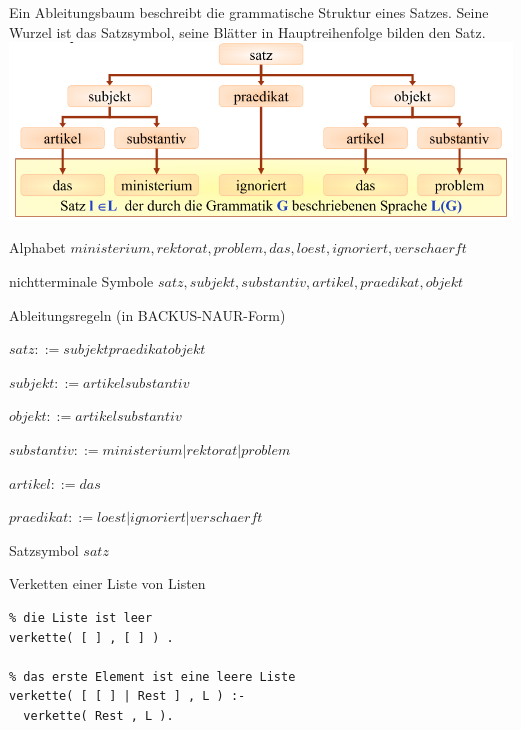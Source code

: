 \documentclass[a4paper]{article}
\begin{document}
\begin{multicols}{3}
  Ein Ableitungsbaum beschreibt die grammatische Struktur eines Satzes.
  Seine Wurzel ist das Satzsymbol, seine Blätter in Hauptreihenfolge
  bilden den Satz.
  \includegraphics[width=\linewidth]{Assets/Logik-ableitungsbaum-beispiel.png}

  \begin{enumerate*}
    \itemsep1pt\parskip0pt
    \item
          Alphabet
          $ministerium, rektorat, problem, das, loest, ignoriert, verschaerft$
    \item
          nichtterminale Symbole
          $satz, subjekt, substantiv, artikel, praedikat,objekt$
    \item
          Ableitungsregeln (in BACKUS-NAUR-Form)

          \begin{itemize*}
            \item
                  $satz ::= subjekt praedikat objekt$
            \item
                  $subjekt ::= artikel substantiv$
            \item
                  $objekt ::=  artikel substantiv$
            \item
                  $substantiv ::= ministerium | rektorat | problem$
            \item
                  $artikel ::= das$
            \item
                  $praedikat ::= loest | ignoriert | verschaerft$
          \end{itemize*}
    \item
          Satzsymbol $satz$
  \end{enumerate*}

  Verketten einer Liste von Listen

  \begin{verbatim}
% die Liste ist leer
verkette( [ ] , [ ] ) .

% das erste Element ist eine leere Liste
verkette( [ [ ] | Rest ] , L ) :-
  verkette( Rest , L ).


\end{verbatim}
\end{multicols}
\end{document}
